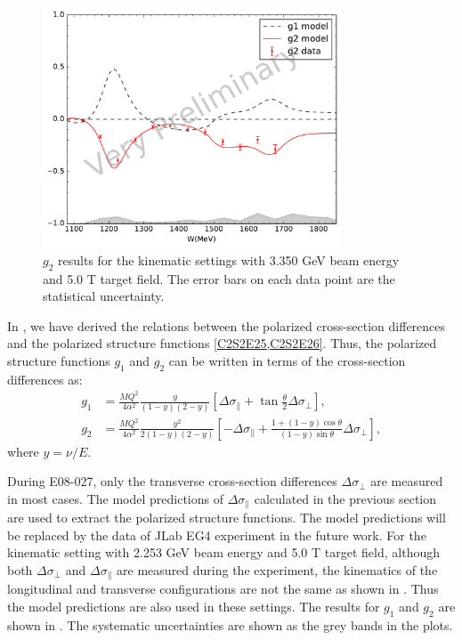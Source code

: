 \begin{figure}[tb!]
  \centering
  \includegraphics[width=0.79\textwidth]{figs/g1g2-model-33505090.pdf}
  \caption[$g_2$ results with $E=3.350$ GeV and $B=5.0$ T.]{$g_2$ results for the kinematic settings with 3.350 GeV beam energy and 5.0 T target field. The error bars on each data point are the statistical uncertainty. \label{C8S4F4}}
\end{figure}

In , we have derived the relations between the polarized cross-section differences and the polarized structure functions \cref{C2S2E25,C2S2E26}. Thus, the polarized structure functions $g_1$ and $g_2$ can be written in terms of the cross-section differences as:
\begin{align} \label{C8S4E1}
g_1 & = \frac{MQ^2}{4\alpha^2}\frac{y}{(1-y)(2-y)}\left[\Delta\sigma_\parallel+\tan\frac{\theta}{2}\Delta\sigma_\perp\right], \\ \label{C8S4E2}
g_2 & = \frac{MQ^2}{4\alpha^2}\frac{y^2}{2(1-y)(2-y)}\left[-\Delta\sigma_\parallel+\frac{1+(1-y)\cos\theta}{(1-y)\sin\theta}\Delta\sigma_\perp\right],
\end{align}
where $y=\nu/E$.

During E08-027, only the transverse cross-section differences $\Delta\sigma_\perp$ are measured in most cases. The model predictions of $\Delta\sigma_\parallel$ calculated in the previous section are used to extract the polarized structure functions. The model predictions will be replaced by the data of JLab EG4 experiment in the future work. For the kinematic setting with 2.253 GeV beam energy and 5.0 T target field, although both $\Delta\sigma_\perp$ and $\Delta\sigma_\parallel$ are measured during the experiment, the kinematics of the longitudinal and transverse configurations are not the same as shown in . Thus the model predictions are also used in these settings. The results for $g_1$ and $g_2$ are shown in . The systematic uncertainties are shown as the grey bands in the plots.

